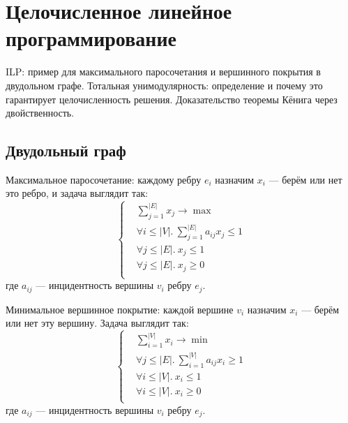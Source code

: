 \section{Целочисленное линейное программирование}
ILP: пример для максимального паросочетания
и вершинного покрытия в двудольном графе.
Тотальная унимодулярность:
определение и почему это гарантирует целочисленность решения.
Доказательство теоремы Кёнига через двойственность.

\subsection{Двудольный граф}
Максимальное паросочетание:
каждому ребру $e_i$ назначим $x_i$
--- берём или нет это ребро,
и задача выглядит так:
\[
    \left\{
        \begin{aligned}
            & \sum_{j=1}^{|E|} x_j \to \max \\
            & \forall i \le |V|.~\sum_{j=1}^{|E|} a_{ij} x_j \le 1 \\
            & \forall j \le |E|.~x_j \le 1 \\
            & \forall j \le |E|.~x_j \ge 0 \\
        \end{aligned}
    \right.
\]
где $a_{ij}$ --- инцидентность вершины $v_i$ ребру $e_j$.

Минимальное вершинное покрытие:
каждой вершине $v_i$ назначим $x_i$
--- берём или нет эту вершину.
Задача выглядит так:
\[
    \left\{
        \begin{aligned}
            & \sum_{i=1}^{|V|} x_i \to \min \\
            & \forall j \le |E|.~\sum_{i=1}^{|V|} a_{ij} x_i \ge 1 \\
            & \forall i \le |V|.~x_i \le 1 \\
            & \forall i \le |V|.~x_i \ge 0 \\
        \end{aligned}
    \right.
\]
где $a_{ij}$ --- инцидентность вершины $v_i$ ребру $e_j$.

